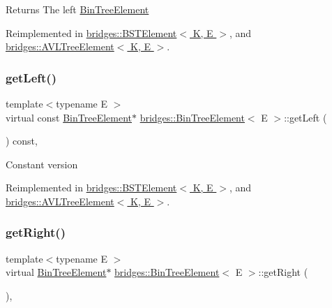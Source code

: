 \begin{DoxyReturn}{Returns}
The left \hyperlink{classbridges_1_1_bin_tree_element}{Bin\+Tree\+Element} 
\end{DoxyReturn}


Reimplemented in \hyperlink{classbridges_1_1_b_s_t_element_a4d8987373c75b51fca94e3c0b78b87a6}{bridges\+::\+B\+S\+T\+Element$<$ K, E $>$}, and \hyperlink{classbridges_1_1_a_v_l_tree_element_a7b5d05660da127f5f6164120d9846d90}{bridges\+::\+A\+V\+L\+Tree\+Element$<$ K, E $>$}.

\hypertarget{classbridges_1_1_bin_tree_element_a0841701bd7d4b444dafbbdfefed067a5}{}\label{classbridges_1_1_bin_tree_element_a0841701bd7d4b444dafbbdfefed067a5} 
\subsubsection{\texorpdfstring{get\+Left()}{getLeft()}\hspace{0.1cm}{\footnotesize\ttfamily [2/2]}}
{\footnotesize\ttfamily template$<$typename E $>$ \\
virtual const \hyperlink{classbridges_1_1_bin_tree_element}{Bin\+Tree\+Element}$\ast$ \hyperlink{classbridges_1_1_bin_tree_element}{bridges\+::\+Bin\+Tree\+Element}$<$ E $>$\+::get\+Left (\begin{DoxyParamCaption}{ }\end{DoxyParamCaption}) const\hspace{0.3cm}{\ttfamily [inline]}, {\ttfamily [virtual]}}

Constant version 

Reimplemented in \hyperlink{classbridges_1_1_b_s_t_element_a2abcfb991f6cc377da2bd9217319fc9c}{bridges\+::\+B\+S\+T\+Element$<$ K, E $>$}, and \hyperlink{classbridges_1_1_a_v_l_tree_element_a61e075db5414b7bd6f52d657401acda3}{bridges\+::\+A\+V\+L\+Tree\+Element$<$ K, E $>$}.

\hypertarget{classbridges_1_1_bin_tree_element_a5751f2fe38e2364f68dc37939fce060f}{}\label{classbridges_1_1_bin_tree_element_a5751f2fe38e2364f68dc37939fce060f} 
\subsubsection{\texorpdfstring{get\+Right()}{getRight()}\hspace{0.1cm}{\footnotesize\ttfamily [1/2]}}
{\footnotesize\ttfamily template$<$typename E $>$ \\
virtual \hyperlink{classbridges_1_1_bin_tree_element}{Bin\+Tree\+Element}$\ast$ \hyperlink{classbridges_1_1_bin_tree_element}{bridges\+::\+Bin\+Tree\+Element}$<$ E $>$\+::get\+Right (\begin{DoxyParamCaption}{ }\end{DoxyParamCaption})\hspace{0.3cm}{\ttfamily [inline]}, {\ttfamily [virtual]}}

